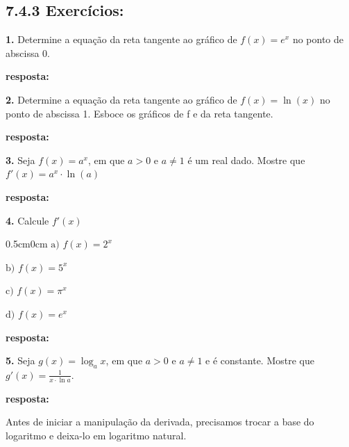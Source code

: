 \documentclass[article,12pt,oneside,a4paper,brazil]{abntex2}
\begin{document}
	\subsection*{7.4.3 Exercícios: }
	\begin{flushleft}	
		\textbf{1.} Determine a equação da reta tangente ao gráfico de $f(x) = e^x$ no ponto de abscissa 0.
		
		\textbf{resposta:}
		
		
		\vspace{1em}
		
		\textbf{2.} Determine a equação da reta tangente ao gráfico de $f(x) = \ln(x)$ no ponto de abscissa 1. Esboce os gráficos de f e da reta tangente.
		
		\textbf{resposta:}
		
		
		\vspace{1em}
		
		\textbf{3.} Seja $f(x) = a^x$, em que $a > 0$ e $a \neq 1$ é um real dado. Mostre que $f'(x)
		= a^x \cdot \ln(a)$	
		
		\textbf{resposta:}
		
		
		\vspace{1em}
		
		\textbf{4.} Calcule $f'(x)$	
			
		\begin{adjustwidth}{0.5cm}{0cm}
			$\text{a) } f(x) = 2^x$
			
			$\text{b) } f(x) = 5^x$
		
			$\text{c) } f(x) = \pi^x$
			
			$\text{d) } f(x) = e^x$
		\end{adjustwidth}	
			
		\textbf{resposta:}
		
		
		\vspace{1em}
		
		\textbf{5.} Seja $g(x)=\log_{a}{x}$, em que $a > 0$ e $a \neq 1$ e é constante. Mostre que $g'(x)=\frac{1}{x \cdot \ln{a}}$.
		
		\textbf{resposta:}
		
		Antes de iniciar a manipulação da derivada, precisamos trocar a base do logaritmo e deixa-lo em logaritmo natural.
		

\end{flushleft}
\end{document}
